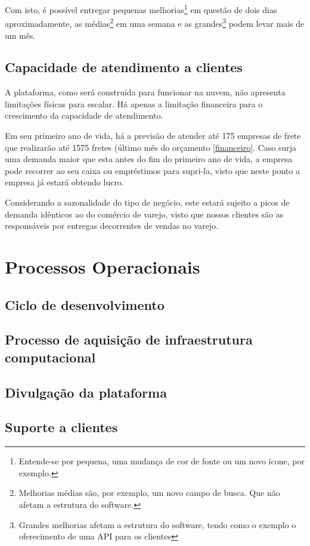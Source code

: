   Com isto, é possível entregar pequenas melhorias\footnote{Entende-se por pequena, uma mudança de cor de fonte ou um novo ícone, por exemplo.} em questão de dois dias aproximadamente, as médias\footnote{Melhorias médias são, por exemplo, um novo campo de busca. Que não afetam a estrutura do software.} em uma semana e as grandes\footnote{Grandes melhorias afetam a estrutura do software, tendo como o exemplo o oferecimento de uma API para os clientes} podem levar mais de um mês.
  
  \subsection{Capacidade de atendimento a clientes}
  A plataforma, como será construída para funcionar na nuvem, não apresenta limitações físicas para escalar. Há apenas a limitação financeira para o crescimento da capacidade de atendimento.
  
  Em seu primeiro ano de vida, há a previsão de atender até 175 empresas de frete que realizarão até 1575 fretes (último mês do orçamento \ref{financeiro}. Caso surja uma demanda maior que esta antes do fim do primeiro ano de vida, a empresa pode recorrer ao seu caixa ou empréstimos para supri-la, visto que neste ponto a empresa já estará obtendo lucro.
  
  Considerando a sazonalidade do tipo de negócio, este estará sujeito a picos de demanda idênticos ao do comércio de varejo, visto que nossos clientes são as responsáveis por entregas decorrentes de vendas no varejo.
  
\section{Processos Operacionais}
  \subsection{Ciclo de desenvolvimento}
  
  \subsection{Processo de aquisição de infraestrutura computacional}
  
  \subsection{Divulgação da plataforma}
  
  \subsection{Suporte a clientes}
